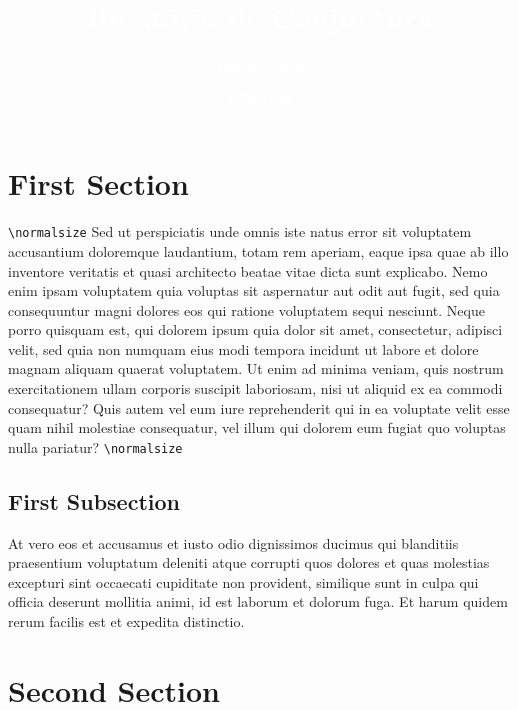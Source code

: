 \documentclass[100,a4paperpaper,]{article}
\title{\textcolor{white}{Relatório de Conjuntura}}
\author{\textcolor{white}{Política Fiscal}}
\date{\textcolor{white}{\today}}
\begin{document}
\renewcommand{\contentsname}{Sumário}

\renewcommand{\pagename}{Página}


\maketitle
\tableofcontents
{}
\clearpage

\section{First Section}

\texttt{\textbackslash{}normalsize} Sed ut perspiciatis unde omnis iste
natus error sit voluptatem accusantium doloremque laudantium, totam rem
aperiam, eaque ipsa quae ab illo inventore veritatis et quasi architecto
beatae vitae dicta sunt explicabo. Nemo enim ipsam voluptatem quia
voluptas sit aspernatur aut odit aut fugit, sed quia consequuntur magni
dolores eos qui ratione voluptatem sequi nesciunt. Neque porro quisquam
est, qui dolorem ipsum quia dolor sit amet, consectetur, adipisci velit,
sed quia non numquam eius modi tempora incidunt ut labore et dolore
magnam aliquam quaerat voluptatem. Ut enim ad minima veniam, quis
nostrum exercitationem ullam corporis suscipit laboriosam, nisi ut
aliquid ex ea commodi consequatur? Quis autem vel eum iure reprehenderit
qui in ea voluptate velit esse quam nihil molestiae consequatur, vel
illum qui dolorem eum fugiat quo voluptas nulla pariatur?
\texttt{\textbackslash{}normalsize}

\subsection{First Subsection}

At vero eos et accusamus et iusto odio dignissimos ducimus qui
blanditiis praesentium voluptatum deleniti atque corrupti quos dolores
et quas molestias excepturi sint occaecati cupiditate non provident,
similique sunt in culpa qui officia deserunt mollitia animi, id est
laborum et dolorum fuga. Et harum quidem rerum facilis est et expedita
distinctio.

\newpage

\section{Second Section}
\end{document}
